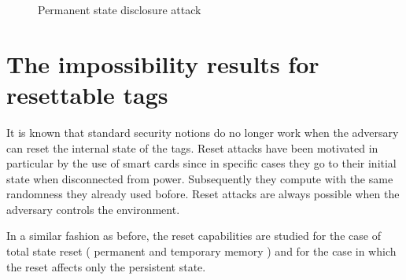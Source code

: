     \begin{figure}[H]
        
    \hspace*{2cm}
    \caption{Permanent state disclosure attack}
    \end{figure}

\section{The impossibility results for resettable tags}

    It is known that standard security notions do no longer work when the adversary can reset the internal state of the tags. Reset attacks have
    been motivated in particular by the use of smart cards since in specific cases they go to their initial state when disconnected from power. Subsequently
    they compute with the same randomness they already used bofore. Reset attacks are always possible when the adversary controls the environment.

    In a similar fashion as before, the reset capabilities are studied for the case of total state reset ( permanent and temporary memory ) and for the case in which
    the reset affects only the persistent state.

